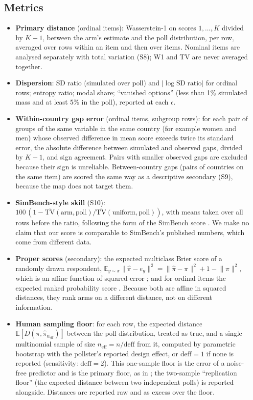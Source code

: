 \documentclass[11pt]{article}
\begin{document}
\subsection{Metrics}
\label{sec:metrics}
\begin{itemize}
  \item \textbf{Primary distance} (ordinal items): Wasserstein-1 on scores $1,\dots,K$ divided by $K-1$, between the arm's estimate and the poll distribution, per row, averaged over rows within an item and then over items. Nominal items are analysed separately with total variation (S8); W1 and TV are never averaged together.
  \item \textbf{Dispersion}: SD ratio (simulated over poll) and $\lvert\log\text{SD ratio}\rvert$ for ordinal rows; entropy ratio; modal share; ``vanished options'' (less than 1\% simulated mass and at least 5\% in the poll), reported at each $\epsilon$.
  \item \textbf{Within-country gap error} (ordinal items, subgroup rows): for each pair of groups of the same variable in the same country (for example women and men) whose observed difference in mean score exceeds twice its standard error, the absolute difference between simulated and observed gaps, divided by $K-1$, and sign agreement. Pairs with smaller observed gaps are excluded because their sign is unreliable. Between-country gaps (pairs of countries on the same item) are scored the same way as a descriptive secondary (S9), because the map does not target them.
  \item \textbf{SimBench-style skill} (S10): $100\,(1-\overline{\mathrm{TV}}(\text{arm},\text{poll})/\overline{\mathrm{TV}}(\text{uniform},\text{poll}))$, with means taken over all rows before the ratio, following the form of the SimBench score \citep{hu2025simbench}. We make no claim that our score is comparable to SimBench's published numbers, which come from different data.
  \item \textbf{Proper scores} (secondary): the expected multiclass Brier score of a randomly drawn respondent, $\mathbb{E}_{y\sim\pi}\lVert\hat\pi-e_y\rVert^2=\lVert\hat\pi-\pi\rVert^2+1-\lVert\pi\rVert^2$, which is an affine function of squared error \citep{brier1950,gneiting2007scoring}; and for ordinal items the expected ranked probability score \citep{epstein1969rps}. Because both are affine in squared distances, they rank arms on a different distance, not on different information.
  \item \textbf{Human sampling floor}: for each row, the expected distance $\mathbb{E}[D(\pi,\hat\pi_{n_{\text{eff}}})]$ between the poll distribution, treated as true, and a single multinomial sample of size $n_{\text{eff}}=n/\text{deff}$ from it, computed by parametric bootstrap with the pollster's reported design effect, or $\text{deff}=1$ if none is reported (sensitivity: $\text{deff}=2$). This one-sample floor is the error of a noise-free predictor and is the primary floor, as in \citet{suh2025subpop}; the two-sample ``replication floor'' (the expected distance between two independent polls) is reported alongside. Distances are reported raw and as excess over the floor.
\end{itemize}
\end{document}
